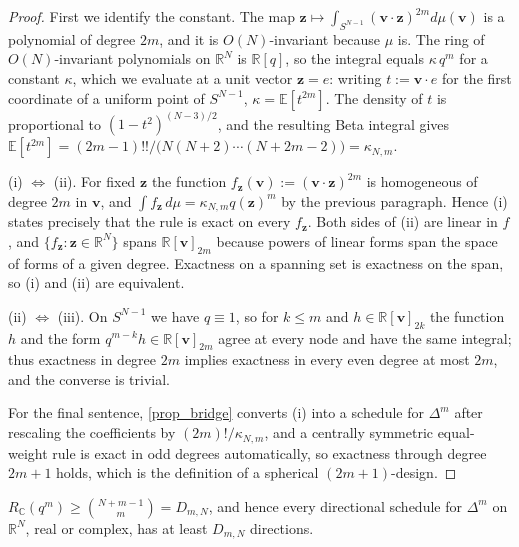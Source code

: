 \documentclass[final]{siamltex}
\newcommand{\R}{\mathbb{R}}
\newcommand{\C}{\mathbb{C}}
\newcommand{\bz}{\bm{z}}
\newcommand{\bv}{\bm{v}}
\begin{document}
\begin{proof}
  First we identify the constant.  The map
  $\bz \mapsto \int_{S^{N-1}}(\bv\cdot\bz)^{2m}d\mu(\bv)$ is a polynomial of
  degree $2m$, and it is $O(N)$-invariant because $\mu$ is.  The ring of
  $O(N)$-invariant polynomials on $\R^{N}$ is $\R[q]$, so the integral equals
  $\kappa\,q^{m}$ for a constant $\kappa$, which we evaluate at a unit vector
  $\bz = e$: writing $t := \bv \cdot e$ for the first coordinate of a uniform
  point of $S^{N-1}$, $\kappa = \mathbb{E}[t^{2m}]$.  The density of $t$ is
  proportional to $(1-t^{2})^{(N-3)/2}$, and the resulting Beta integral gives
  $\mathbb{E}[t^{2m}] = (2m-1)!!/\bigl(N(N+2)\cdots(N+2m-2)\bigr) = \kappa_{N,m}$.

  (i) $\Leftrightarrow$ (ii).  For fixed $\bz$ the function
  $f_{\bz}(\bv) := (\bv\cdot\bz)^{2m}$ is homogeneous of degree $2m$ in $\bv$,
  and $\int f_{\bz}\,d\mu = \kappa_{N,m}q(\bz)^{m}$ by the previous paragraph.
  Hence (i) states precisely that the rule is exact on every $f_{\bz}$.  Both
  sides of (ii) are linear in $f$, and $\{f_{\bz} : \bz \in \R^{N}\}$ spans
  $\R[\bv]_{2m}$ because powers of linear forms span the space of forms of a
  given degree.  Exactness on a spanning set is exactness on the span, so (i)
  and (ii) are equivalent.

  (ii) $\Leftrightarrow$ (iii).  On $S^{N-1}$ we have $q \equiv 1$, so for
  $k \le m$ and $h \in \R[\bv]_{2k}$ the function $h$ and the form
  $q^{m-k}h \in \R[\bv]_{2m}$ agree at every node and have the same integral;
  thus exactness in degree $2m$ implies exactness in every even degree at most
  $2m$, and the converse is trivial.

  For the final sentence, \cref{prop_bridge} converts (i) into a schedule for
  $\Delta^{m}$ after rescaling the coefficients by
  $(2m)!/\kappa_{N,m}$, and a centrally symmetric equal-weight rule is exact in
  odd degrees automatically, so exactness through degree $2m+1$ holds, which is
  the definition of a spherical $(2m{+}1)$-design.
\end{proof}

\begin{theorem}\label{thm_lower}
  $R_{\C}(q^{m}) \ge \binom{N+m-1}{m} = D_{m,N}$, and hence every directional
  schedule for $\Delta^{m}$ on $\R^{N}$, real or complex, has at least
  $D_{m,N}$ directions.
\end{theorem}
\end{document}
